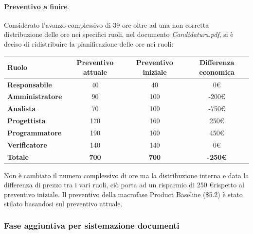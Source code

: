 \paragraph{Preventivo a finire} \hfill \break
Considerato l'avanzo complessivo di 39 ore oltre ad una non corretta distribuzione delle ore nei specifici ruoli, nel documento \emph{Candidatura.pdf}, si è deciso di ridistribuire la pianificazione delle ore nei ruoli:
\begin{center}
	\renewcommand{\arraystretch}{1.8}
	\begin{tabular}{ | l |c|c|c| }
    \hline
    \textbf{Ruolo} & \textbf{Preventivo attuale} & \textbf{Preventivo iniziale}  & \textbf{Differenza economica}\\
	\hline
    \textbf{Responsabile} & 40 & 40 & 0\euro \\
    \hline
    \textbf{Amministratore} & 90 & 100 & -200\euro \\
    \hline
    \textbf{Analista} & 70 & 100 & -750\euro \\
    \hline
    \textbf{Progettista} & 170 & 160 & 250\euro \\
    \hline
    \textbf{Programmatore} & 190 & 160 & 450\euro \\
    \hline
    \textbf{Verificatore} & 140 & 140 & 0\euro \\
    \hline
    \textbf{Totale} & \textbf{700} & \textbf{700} & \textbf{-250\euro} \\
    \hline
    \end{tabular}
\end{center}
Non è cambiato il numero complessivo di ore ma la distribuzione interna e data la differenza di prezzo tra i vari ruoli, ciò porta ad un risparmio di 250 \euro rispetto al preventivo iniziale. \newline
Il preventivo della macrofase Product Baseline (\$5.2) è stato stilato basandosi sul preventivo attuale.

\subsubsection{Fase aggiuntiva per sistemazione documenti}
